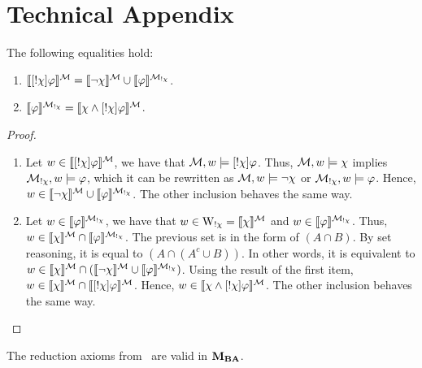 \section{Technical Appendix}


\begin{lemma}\label{lem:palproperties} The following equalities hold:
\begin{enumerate}
\item $\llbracket [!\chi]\varphi \rrbracket^{\mathcal{M}} = \llbracket \neg\chi \rrbracket^{\mathcal{M}} \cup \llbracket \varphi \rrbracket^{\mathcal{M}_{!\chi}}$.
\item $\llbracket \varphi \rrbracket^{\mathcal{M}_{!\chi}} = \llbracket \chi \wedge [!\chi]\varphi \rrbracket^{\mathcal{M}}$.
\end{enumerate}
\end{lemma}

\begin{proof}
\ 
\begin{enumerate}
\item Let $w \in \llbracket [!\chi]\varphi \rrbracket^{\mathcal{M}}$, we have that $\mathcal{M},w \models [!\chi]\varphi$. Thus, $\mathcal{M},w \models \chi$ implies $\mathcal{M}_{!\chi},w \models \varphi$, which it can be rewritten as $\mathcal{M},w \models \neg\chi$ or $\mathcal{M}_{!\chi},w \models \varphi$. Hence, $w \in \llbracket \neg\chi \rrbracket^{\mathcal{M}} \cup \llbracket \varphi \rrbracket^{\mathcal{M}_{!\chi}}$. The other inclusion behaves the same way.
\item Let $w \in \llbracket \varphi \rrbracket^{\mathcal{M}_{!\chi}}$, we have that $w \in \operatorname{W}_{!\chi} = \llbracket \chi \rrbracket^{\mathcal{M}}$ and $w \in \llbracket \varphi \rrbracket^{\mathcal{M}_{!\chi}}$. Thus, $w \in \llbracket \chi \rrbracket^{\mathcal{M}} \cap \llbracket \varphi \rrbracket^{\mathcal{M}_{!\chi}}$. The previous set is in the form of $(A \cap B)$. By set reasoning, it is equal to $(A \cap (A^c \cup B))$.
In other words, it is equivalent to $w \in \llbracket \chi \rrbracket^{\mathcal{M}} \cap (\llbracket \neg\chi \rrbracket^{\mathcal{M}} \cup \llbracket \varphi \rrbracket^{\mathcal{M}_{!\chi}})$. Using the result of the first item, $w \in \llbracket \chi \rrbracket^{\mathcal{M}} \cap \llbracket [!\chi]\varphi \rrbracket^{\mathcal{M}}$. Hence, $w \in \llbracket \chi \wedge [!\chi]\varphi \rrbracket^{\mathcal{M}}$.
The other inclusion behaves the same way.
\end{enumerate}
\end{proof}

\begin{lemma}
The reduction axioms from~ are valid in $\mathbf{M}_{\mathbf{BA}}$.
\end{lemma}

